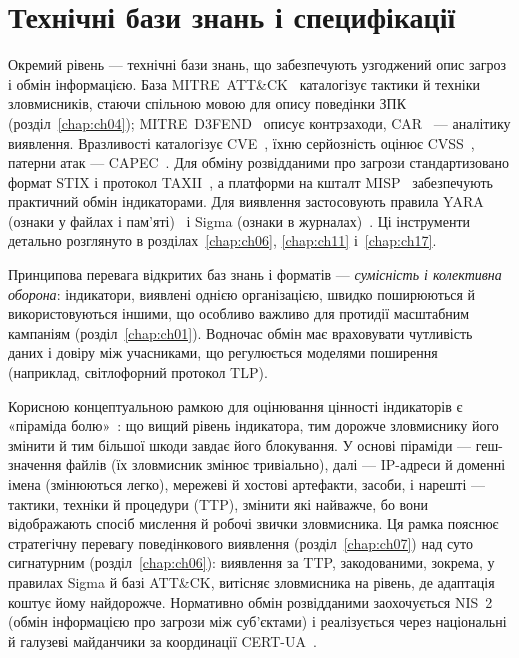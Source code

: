 \section{Технічні бази знань і специфікації}\label{sec:ch02-technical}

Окремий рівень --- технічні бази знань, що забезпечують узгоджений опис загроз і обмін інформацією. База MITRE~ATT\&CK~\cite{mitre-attack} каталогізує тактики й техніки зловмисників, стаючи спільною мовою для опису поведінки ЗПК (розділ~\ref{chap:ch04}); MITRE~D3FEND~\cite{mitre-defend} описує контрзаходи, CAR~\cite{mitre-car} --- аналітику виявлення. Вразливості каталогізує CVE~\cite{cve}, їхню серйозність оцінює CVSS~\cite{ch02:cvss}, патерни атак --- CAPEC~\cite{capec}. Для обміну розвідданими про загрози стандартизовано формат STIX і протокол TAXII~\cite{stix,ch02:taxii}, а платформи на кшталт MISP~\cite{ch02:misp} забезпечують практичний обмін індикаторами. Для виявлення застосовують правила YARA (ознаки у файлах і пам'яті)~\cite{yara} і Sigma (ознаки в журналах)~\cite{sigma}. Ці інструменти детально розглянуто в розділах~\ref{chap:ch06}, \ref{chap:ch11} і~\ref{chap:ch17}.

Принципова перевага відкритих баз знань і форматів --- \emph{сумісність і колективна оборона}: індикатори, виявлені однією організацією, швидко поширюються й використовуються іншими, що особливо важливо для протидії масштабним кампаніям (розділ~\ref{chap:ch01}). Водночас обмін має враховувати чутливість даних і довіру між учасниками, що регулюється моделями поширення (наприклад, світлофорний протокол TLP).

Корисною концептуальною рамкою для оцінювання цінності індикаторів є «піраміда болю»~\cite{pyramid}: що вищий рівень індикатора, тим дорожче зловмиснику його змінити й тим більшої шкоди завдає його блокування. У основі піраміди --- геш-значення файлів (їх зловмисник змінює тривіально), далі --- IP-адреси й доменні імена (змінюються легко), мережеві й хостові артефакти, засоби, і нарешті --- тактики, техніки й процедури (TTP), змінити які найважче, бо вони відображають спосіб мислення й робочі звички зловмисника. Ця рамка пояснює стратегічну перевагу поведінкового виявлення (розділ~\ref{chap:ch07}) над суто сигнатурним (розділ~\ref{chap:ch06}): виявлення за TTP, закодованими, зокрема, у правилах Sigma й базі ATT\&CK, витісняє зловмисника на рівень, де адаптація коштує йому найдорожче. Нормативно обмін розвідданими заохочується NIS~2 (обмін інформацією про загрози між суб'єктами) і реалізується через національні й галузеві майданчики за координації CERT-UA~\cite{cert-ua}.

